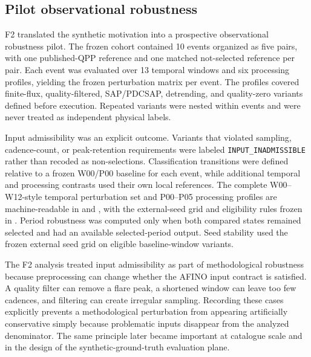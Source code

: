 \documentclass[11pt,a4paper]{article}
\begin{document}
\subsection{Pilot observational robustness}
F2 translated the synthetic motivation into a prospective observational robustness pilot. The frozen cohort contained 10 events organized as five pairs, with one published-QPP reference and one matched not-selected reference per pair. Each event was evaluated over 13 temporal windows and six processing profiles, yielding the frozen perturbation matrix per event. The profiles covered finite-flux, quality-filtered, SAP/PDCSAP, detrending, and quality-zero variants defined before execution. Repeated variants were nested within events and were never treated as independent physical labels.

Input admissibility was an explicit outcome. Variants that violated sampling, cadence-count, or peak-retention requirements were labeled \texttt{INPUT\_INADMISSIBLE} rather than recoded as non-selections. Classification transitions were defined relative to a frozen W00/P00 baseline for each event, while additional temporal and processing contrasts used their own local references. The complete W00--W12-style temporal perturbation set and P00--P05 processing profiles are machine-readable in  and , with the external-seed grid and eligibility rules frozen in . Period robustness was computed only when both compared states remained selected and had an available selected-period output. Seed stability used the frozen external seed grid on eligible baseline-window variants.

The F2 analysis treated input admissibility as part of methodological robustness because preprocessing can change whether the AFINO input contract is satisfied. A quality filter can remove a flare peak, a shortened window can leave too few cadences, and filtering can create irregular sampling. Recording these cases explicitly prevents a methodological perturbation from appearing artificially conservative simply because problematic inputs disappear from the analyzed denominator. The same principle later became important at catalogue scale and in the design of the synthetic-ground-truth evaluation plane.
\end{document}
